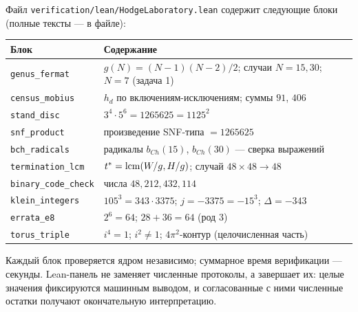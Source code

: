 Файл \texttt{verification/lean/HodgeLaboratory.lean} содержит
следующие блоки (полные тексты --- в файле):

\begin{center}
\small
\begin{tabularx}{\textwidth}{@{}l >{\raggedright\arraybackslash}X@{}}
\toprule
Блок & Содержание \\
\midrule
\texttt{genus\_fermat} & $g(N)=(N-1)(N-2)/2$; случаи $N=15,30$;
$N=7$ (задача 1) \\
\texttt{census\_mobius} & $h_d$ по включениям-исключениям; суммы
$91$, $406$ \\
\texttt{stand\_disc} & $3^4\cdot5^6=1265625=1125^2$ \\
\texttt{snf\_product} & произведение SNF-типа $=1265625$ \\
\texttt{bch\_radicals} & радикалы $b_{Ch}(15)$, $b_{Ch}(30)$ ---
сверка выражений \\
\texttt{termination\_lcm} & $t^*=\operatorname{lcm}(W/g,H/g)$; случай
$48\times48\to48$ \\
\texttt{binary\_code\_check} & числа $48,212,432,114$ \\
\texttt{klein\_integers} & $105^3=343\cdot3375$;
$j=-3375=-15^3$; $\Delta=-343$ \\
\texttt{errata\_e8} & $2^6=64$; $28+36=64$ (род 3) \\
\texttt{torus\_triple} & $i^4=1$; $i^2\ne1$; $4\pi^2$-контур
(целочисленная часть) \\
\bottomrule
\end{tabularx}
\end{center}

Каждый блок проверяется ядром независимо; суммарное время
верификации --- секунды. Lean-панель не заменяет численные
протоколы, а завершает их: целые значения фиксируются машинным
выводом, и согласованные с ними численные остатки получают
окончательную интерпретацию.
